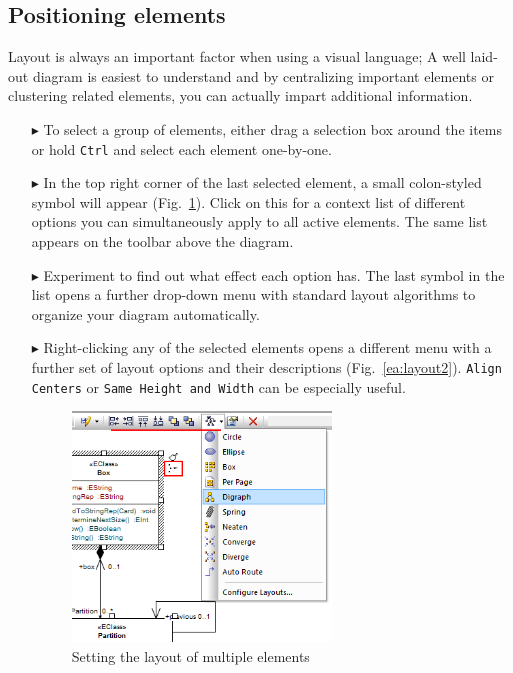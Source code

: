 \subsection{Positioning elements}

Layout is always an important factor when using a visual language; A well laid-out diagram is easiest to understand and by centralizing important elements or
clustering related elements, you can actually impart additional information.

\begin{enumerate}
\item[$\blacktriangleright$] To select a group of elements, either drag a selection box around the items or hold \texttt{Ctrl} and select each element
one-by-one.

\item[$\blacktriangleright$] In the top right corner of the last selected element, a small colon-styled symbol will appear (Fig.~\ref{ea:layout1}). Click on
this for a context list of different options you can simultaneously apply to all active elements. The same list appears on the toolbar above the
diagram. 

\item[$\blacktriangleright$] Experiment to find out what effect each option has. The last symbol in the list opens a further drop-down menu with standard layout
algorithms to organize your diagram automatically.

\item[$\blacktriangleright$] Right-clicking any of the selected elements opens a different menu with a further set of layout options and their descriptions
(Fig.~\ref{ea:layout2}). \texttt{Align Centers} or \texttt{Same Height and Width} can be especially useful.

\begin{figure}[htbp]
\begin{center} 
  \includegraphics[width=0.65\textwidth]{ea_layoutElementsCommonContext}
  \caption{Setting the layout of multiple elements}  
  \label{ea:layout1}
\end{center}
\end{figure}


\end{enumerate}
